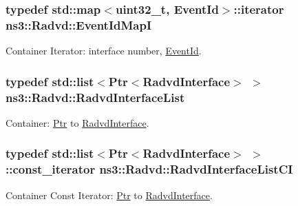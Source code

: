 \subsubsection[{\texorpdfstring{Event\+Id\+MapI}{EventIdMapI}}]{\setlength{\rightskip}{0pt plus 5cm}typedef std\+::map$<$uint32\+\_\+t, {\bf Event\+Id}$>$\+::iterator {\bf ns3\+::\+Radvd\+::\+Event\+Id\+MapI}\hspace{0.3cm}{\ttfamily [private]}}\hypertarget{classns3_1_1Radvd_ae2bbceecbc9c1188ed4e43026a00d4b2}{}\label{classns3_1_1Radvd_ae2bbceecbc9c1188ed4e43026a00d4b2}


Container Iterator\+: interface number, \hyperlink{classns3_1_1EventId}{Event\+Id}. 

\subsubsection[{\texorpdfstring{Radvd\+Interface\+List}{RadvdInterfaceList}}]{\setlength{\rightskip}{0pt plus 5cm}typedef {\bf std\+::list}$<${\bf Ptr}$<${\bf Radvd\+Interface}$>$ $>$ {\bf ns3\+::\+Radvd\+::\+Radvd\+Interface\+List}\hspace{0.3cm}{\ttfamily [private]}}\hypertarget{classns3_1_1Radvd_a86074d8cb8e7395c05eb5c73046c5adc}{}\label{classns3_1_1Radvd_a86074d8cb8e7395c05eb5c73046c5adc}


Container\+: \hyperlink{classns3_1_1Ptr}{Ptr} to \hyperlink{classns3_1_1RadvdInterface}{Radvd\+Interface}. 

\subsubsection[{\texorpdfstring{Radvd\+Interface\+List\+CI}{RadvdInterfaceListCI}}]{\setlength{\rightskip}{0pt plus 5cm}typedef {\bf std\+::list}$<${\bf Ptr}$<${\bf Radvd\+Interface}$>$ $>$\+::const\+\_\+iterator {\bf ns3\+::\+Radvd\+::\+Radvd\+Interface\+List\+CI}\hspace{0.3cm}{\ttfamily [private]}}\hypertarget{classns3_1_1Radvd_ae425a17fa24b2716bd104f81450e158b}{}\label{classns3_1_1Radvd_ae425a17fa24b2716bd104f81450e158b}


Container Const Iterator\+: \hyperlink{classns3_1_1Ptr}{Ptr} to \hyperlink{classns3_1_1RadvdInterface}{Radvd\+Interface}. 

